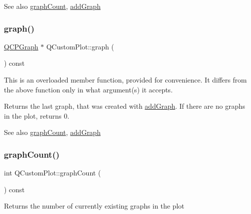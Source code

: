 \begin{DoxySeeAlso}{See also}
\hyperlink{class_q_custom_plot_a5e1787cdde868c4d3790f9ebc8207d90}{graph\+Count}, \hyperlink{class_q_custom_plot_a6fb2873d35a8a8089842d81a70a54167}{add\+Graph} 
\end{DoxySeeAlso}
\hypertarget{class_q_custom_plot_aac190865a67f19af3fdf2136774997af}{}\label{class_q_custom_plot_aac190865a67f19af3fdf2136774997af} 
\subsubsection{\texorpdfstring{graph()}{graph()}\hspace{0.1cm}{\footnotesize\ttfamily [2/2]}}
{\footnotesize\ttfamily \hyperlink{class_q_c_p_graph}{Q\+C\+P\+Graph} $\ast$ Q\+Custom\+Plot\+::graph (\begin{DoxyParamCaption}{ }\end{DoxyParamCaption}) const}

This is an overloaded member function, provided for convenience. It differs from the above function only in what argument(s) it accepts.

Returns the last graph, that was created with \hyperlink{class_q_custom_plot_a6fb2873d35a8a8089842d81a70a54167}{add\+Graph}. If there are no graphs in the plot, returns 0.

\begin{DoxySeeAlso}{See also}
\hyperlink{class_q_custom_plot_a5e1787cdde868c4d3790f9ebc8207d90}{graph\+Count}, \hyperlink{class_q_custom_plot_a6fb2873d35a8a8089842d81a70a54167}{add\+Graph} 
\end{DoxySeeAlso}
\hypertarget{class_q_custom_plot_a5e1787cdde868c4d3790f9ebc8207d90}{}\label{class_q_custom_plot_a5e1787cdde868c4d3790f9ebc8207d90} 
\subsubsection{\texorpdfstring{graph\+Count()}{graphCount()}}
{\footnotesize\ttfamily int Q\+Custom\+Plot\+::graph\+Count (\begin{DoxyParamCaption}{ }\end{DoxyParamCaption}) const}

Returns the number of currently existing graphs in the plot

